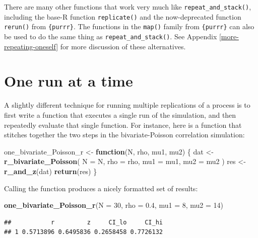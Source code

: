 \documentclass[
]{book}
\newenvironment{Shaded}{\begin{snugshade}}{\end{snugshade}}
\newcommand{\AttributeTok}[1]{\textcolor[rgb]{0.13,0.29,0.53}{#1}}
\newcommand{\ControlFlowTok}[1]{\textcolor[rgb]{0.13,0.29,0.53}{\textbf{#1}}}
\newcommand{\DecValTok}[1]{\textcolor[rgb]{0.00,0.00,0.81}{#1}}
\newcommand{\FloatTok}[1]{\textcolor[rgb]{0.00,0.00,0.81}{#1}}
\newcommand{\FunctionTok}[1]{\textcolor[rgb]{0.13,0.29,0.53}{\textbf{#1}}}
\newcommand{\NormalTok}[1]{#1}
\newcommand{\OtherTok}[1]{\textcolor[rgb]{0.56,0.35,0.01}{#1}}
\begin{document}
There are many other functions that work very much like \texttt{repeat\_and\_stack()}, including the base-R function \texttt{replicate()} and the now-deprecated function \texttt{rerun()} from \texttt{\{purrr\}}.
The functions in the \texttt{map()} family from \texttt{\{purrr\}} can also be used to do the same thing as \texttt{repeat\_and\_stack()}.
See Appendix \ref{more-repeating-oneself} for more discussion of these alternatives.

\section{One run at a time}\label{one-run-at-a-time}

A slightly different technique for running multiple replications of a process is to first write a function that executes a single run of the simulation, and then repeatedly evaluate that single function.
For instance, here is a function that stitches together the two steps in the bivariate-Poisson correlation simulation:

\begin{Shaded}
\begin{Highlighting}[]
\NormalTok{one\_bivariate\_Poisson\_r }\OtherTok{\textless{}{-}} \ControlFlowTok{function}\NormalTok{(N, rho, mu1, mu2) \{}
\NormalTok{  dat }\OtherTok{\textless{}{-}} \FunctionTok{r\_bivariate\_Poisson}\NormalTok{( }\AttributeTok{N =}\NormalTok{ N, }\AttributeTok{rho =}\NormalTok{ rho, }\AttributeTok{mu1 =}\NormalTok{ mu1, }\AttributeTok{mu2 =}\NormalTok{ mu2 )}
\NormalTok{  res }\OtherTok{\textless{}{-}} \FunctionTok{r\_and\_z}\NormalTok{(dat)}
  \FunctionTok{return}\NormalTok{(res)}
\NormalTok{\}}
\end{Highlighting}
\end{Shaded}

Calling the function produces a nicely formatted set of results:

\begin{Shaded}
\begin{Highlighting}[]
\FunctionTok{one\_bivariate\_Poisson\_r}\NormalTok{(}\AttributeTok{N =} \DecValTok{30}\NormalTok{, }\AttributeTok{rho =} \FloatTok{0.4}\NormalTok{, }\AttributeTok{mu1 =} \DecValTok{8}\NormalTok{, }\AttributeTok{mu2 =} \DecValTok{14}\NormalTok{)}
\end{Highlighting}
\end{Shaded}

\begin{verbatim}
##           r         z     CI_lo     CI_hi
## 1 0.5713896 0.6495836 0.2658458 0.7726132
\end{verbatim}
\end{document}
